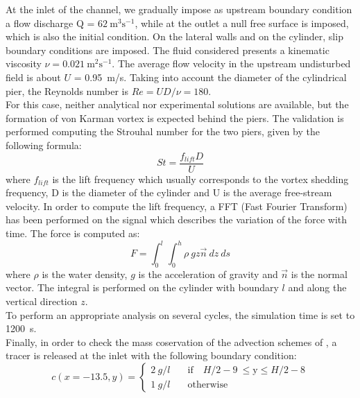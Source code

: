 At the inlet of the channel, we gradually impose as upstream boundary condition a flow discharge Q = $62~\text{m}^3\text{s}^{-1}$,
while at the outlet a null free surface is imposed, which is also the initial condition. On the lateral walls and on the cylinder, slip boundary conditions are imposed.
The fluid considered presents a kinematic viscosity $\nu=0.021~\text{m}^2\text{s}^{-1}$. The average flow velocity in the upstream undisturbed field is
about $U$ = 0.95~m/s. Taking into account the diameter of the cylindrical pier, the Reynolds number is $Re = UD/\nu=180$. \\
For this case, neither analytical nor experimental solutions are available, but the formation of von Karman vortex is expected behind the piers. The validation is performed computing the Strouhal number for the two piers, given by the following formula:
\begin{equation*}
St=\frac{f_{lift}D}{U}
\end{equation*}
where $f_{lift}$ is the lift frequency which usually corresponds to the vortex shedding frequency, D is the diameter of the cylinder and U is the average free-stream velocity.
In order to compute the lift frequency, a FFT (Fast Fourier Transform) has been performed on the signal which describes the variation of the force with time. The force is computed as:
\begin{equation*}
F=\int_0^l\int_0^h \rho~gz \vec{n}~dz~ds
\end{equation*}
where $\rho$ is the water density, $g$ is the acceleration of gravity and $\vec{n}$ is the normal vector. The integral is performed on the cylinder with boundary $l$ and along the vertical direction $z$. \\
To perform an appropriate analysis on several cycles, the simulation time is set to 1200~s. \\
Finally, in order to check the mass coservation of the advection schemes of , a tracer is released at the inlet with the following boundary condition:
\begin{equation*}
 c(x=-13.5,y)=\left\{
\begin{array}{rl}
 2 ~g/l\quad & \text{if} \quad H/2-9~\leq \text{y} \leq H/2-8\\
 1 ~g/l\quad & \text{otherwise}
\end{array}\right .
\end{equation*}
